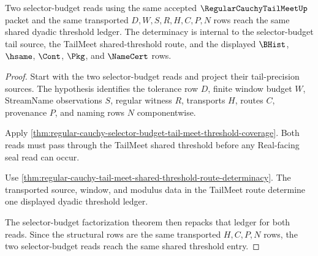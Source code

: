 \begin{theorem}
\label{thm:regular-cauchy-selector-budget-tail-meet-route-determinacy}
Two selector-budget reads using the same accepted $\RegularCauchyTailMeetUp$ packet and the same transported $D,W,S,R,H,C,P,N$ rows reach the same shared dyadic threshold ledger. The determinacy is internal to the selector-budget tail source, the TailMeet shared-threshold route, and the displayed $\BHist$, $\hsame$, $\Cont$, $\Pkg$, and $\NameCert$ rows.
\end{theorem}
\begin{proof}
Start with the two selector-budget reads and project their tail-precision sources. The hypothesis identifies the tolerance row $D$, finite window budget $W$, StreamName observations $S$, regular witness $R$, transports $H$, routes $C$, provenance $P$, and naming rows $N$ componentwise.

Apply \autoref{thm:regular-cauchy-selector-budget-tail-meet-threshold-coverage}. Both reads must pass through the TailMeet shared threshold before any Real-facing seal read can occur.

Use \autoref{thm:regular-cauchy-tail-meet-shared-threshold-route-determinacy}. The transported source, window, and modulus data in the TailMeet route determine one displayed dyadic threshold ledger.

The selector-budget factorization theorem then repacks that ledger for both reads. Since the structural rows are the same transported $H,C,P,N$ rows, the two selector-budget reads reach the same shared threshold entry.
\end{proof}

